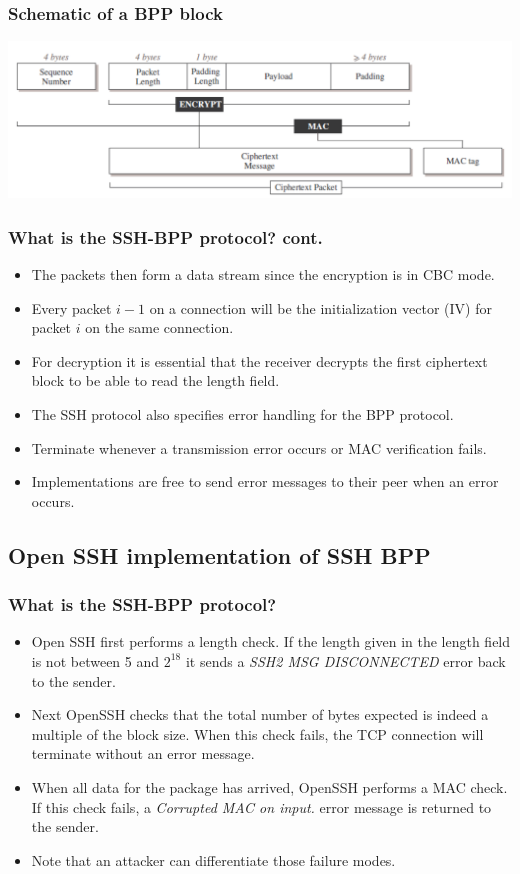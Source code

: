 \documentclass[fleqn]{beamer}
\begin{document}
  \begin{frame}
    \frametitle{Schematic of a BPP block}
    \begin{center}
    \includegraphics[scale=.4]{SSHBPP.pdf}
    \end{center}
  \end{frame}

  \begin{frame}
    \frametitle{What is the SSH-BPP protocol? cont.}
	\begin{itemize}
	\item The packets then form a data stream since the encryption is in CBC mode. 
	\item Every packet $i-1$ on a connection will be the initialization vector (IV) for packet $i$ on the same connection.
	\item For decryption it is essential that the receiver decrypts the first ciphertext block to be able to read the length field.
	\item The SSH protocol also specifies error handling for the BPP protocol. 
	\item Terminate whenever a transmission error occurs or MAC verification fails. 
	\item Implementations are free to send error messages to their peer when an error occurs.
	\end{itemize}
  \end{frame}
  
\subsection{Open SSH implementation of SSH BPP}
    \begin{frame}
  \frametitle{What is the SSH-BPP protocol?}
    \begin{itemize}
      \item Open SSH first performs a length check. If the length given in the length field is not between 5 and $2^{18}$ it sends a \textit{SSH2 MSG DISCONNECTED} error back to the sender.
      \item Next OpenSSH checks that the total number of bytes expected is indeed a multiple of the block size. When this check fails, the TCP connection will terminate without an error message.
      \item When all data for the package has arrived, OpenSSH performs a MAC check. If this check fails, a \textit{Corrupted MAC on input.} error message is returned to the sender.
      \item Note that an attacker can differentiate those failure modes.
    \end{itemize}
  \end{frame}
\end{document}
